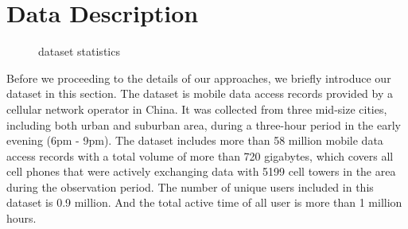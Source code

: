 \section{Data Description}

\begin{figure}[ht]
  \centering
  \caption{dataset statistics}
	\label{fig:data_stat}
\end{figure}

Before we proceeding to the details of our approaches, we briefly introduce our dataset in this section. The dataset is mobile data access records provided by a cellular network operator in China. It was collected from three mid-size cities, including both urban and suburban area, during a three-hour period in the early evening (6pm - 9pm). The dataset includes more than 58 million mobile data access records with a total volume of more than 720 gigabytes, which covers all cell phones that were actively exchanging data with 5199 cell towers in the area during the observation period. The number of unique users included in this dataset is 0.9 million. And the total active time of all user is more than 1 million hours. 

